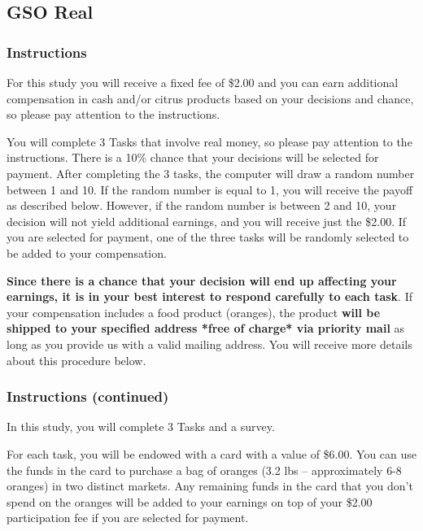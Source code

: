 \documentclass[12pt]{article}
\begin{document}
{\clearpage


\subsection{GSO Real}

\subsubsection*{Instructions}

For this study you will receive a fixed fee of \$2.00 and you can earn additional compensation in cash and/or citrus products based on your decisions and chance, so please pay attention to the instructions.
 
You will complete 3 Tasks that involve real money, so please pay attention to the instructions. There is a 10\% chance that your decisions will be selected for payment. After completing the 3 tasks, the computer will draw a random number between 1 and 10. If the random number is equal to 1, you will receive the payoff as described below.
However, if the random number is between 2 and 10, your decision will not yield additional earnings, and you will receive just the \$2.00. If you are selected for payment, one of the three tasks will be randomly selected to be added to your compensation.

\textbf{Since there is a chance that your decision will end up affecting your earnings, it is in your best interest to respond carefully to each task}. If your compensation includes a food product (oranges), the product \textbf{will be shipped to your specified address *free of charge* via priority mail} as long as you provide us with a valid mailing address. You will receive more details about this procedure below.


\clearpage

\subsubsection*{Instructions (continued)}

In this study, you will complete 3 Tasks and a survey.

For each task, you will be endowed with a card with a value of \$6.00. You can use the funds in the card to purchase a bag of oranges (3.2 lbs – approximately 6-8 oranges) in two distinct markets. Any remaining funds in the card that you don’t spend on the oranges will be added to your earnings on top of your \$2.00 participation fee if you are selected for payment.

}
\end{document}
